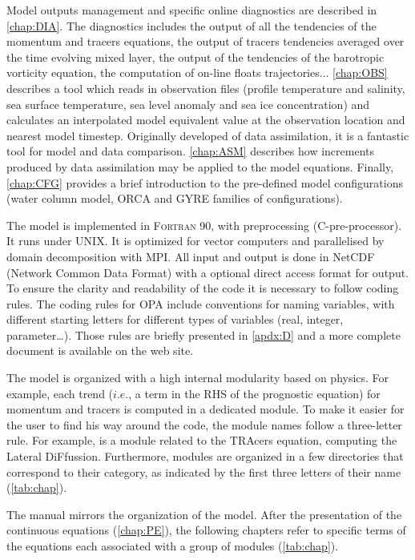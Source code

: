 \documentclass[../tex_main/NEMO_manual]{subfiles}
\begin{document}

Model outputs management and specific online diagnostics are described in \autoref{chap:DIA}.
The diagnostics includes the output of all the tendencies of the momentum and tracers equations,
the output of tracers tendencies averaged over the time evolving mixed layer,
the output of the tendencies of the barotropic vorticity equation,
the computation of on-line floats trajectories...
\autoref{chap:OBS} describes a tool which reads in observation files
(profile temperature and salinity, sea surface temperature, sea level anomaly and sea ice concentration) 
and calculates an interpolated model equivalent value at the observation location and nearest model timestep.
Originally developed of data assimilation, it is a fantastic tool for model and data comparison.
\autoref{chap:ASM} describes how increments produced by data assimilation may be applied to the model equations.
Finally, \autoref{chap:CFG} provides a brief introduction to the pre-defined model configurations
(water column model, ORCA and GYRE families of configurations).

The model is implemented in \textsc{Fortran 90}, with preprocessing (C-pre-processor).
It runs under UNIX.
It is optimized for vector computers and parallelised by domain decomposition with MPI.
All input and output is done in NetCDF (Network Common Data Format) with a optional direct access format for output.
To ensure the clarity and readability of the code it is necessary to follow coding rules.
The coding rules for OPA include conventions for naming variables,
with different starting letters for different types of variables (real, integer, parameter\ldots).
Those rules are briefly presented in \autoref{apdx:D} and a more complete document is available on
the \NEMO web site.

The model is organized with a high internal modularity based on physics.
For example, each trend ($i.e.$, a term in the RHS of the prognostic equation) for momentum and tracers
is computed in a dedicated module.
To make it easier for the user to find his way around the code, the module names follow a three-letter rule.
For example,  is a module related to the TRAcers equation, computing the Lateral DiFfussion. 
Furthermore, modules are organized in a few directories that correspond to their category,
as indicated by the first three letters of their name (\autoref{tab:chap}).

The manual mirrors the organization of the model.
After the presentation of the continuous equations (\autoref{chap:PE}),
the following chapters refer to specific terms of the equations each associated with
a group of modules (\autoref{tab:chap}).
\end{document}
